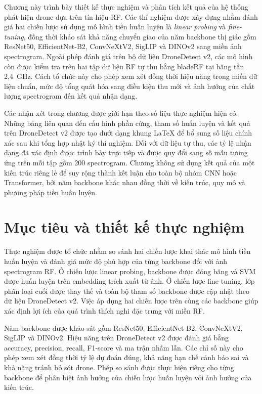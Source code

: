 \documentclass[../DoAn.tex]{subfiles}
\begin{document}
\label{chap:danh_gia_thuc_nghiem}

Chương này trình bày thiết kế thực nghiệm và phân tích kết quả của hệ thống phát hiện drone dựa trên tín hiệu RF. Các thí nghiệm được xây dựng nhằm đánh giá hai chiến lược sử dụng mô hình tiền huấn luyện là \textit{linear probing} và \textit{fine-tuning}, đồng thời khảo sát khả năng chuyển giao của năm backbone thị giác gồm ResNet50, EfficientNet-B2, ConvNeXtV2, SigLIP và DINOv2 sang miền ảnh spectrogram. Ngoài phép đánh giá trên bộ dữ liệu DroneDetect v2, các mô hình còn được kiểm tra trên hai tập dữ liệu RF tự thu bằng bladeRF tại băng tần 2,4~GHz. Cách tổ chức này cho phép xem xét đồng thời hiệu năng trong miền dữ liệu chuẩn, mức độ tổng quát hóa sang điều kiện thu mới và ảnh hưởng của chất lượng spectrogram đến kết quả nhận dạng.

Các nhận xét trong chương được giới hạn theo số liệu thực nghiệm hiện có. Những bảng liên quan đến cấu hình phần cứng, tham số huấn luyện và kết quả trên DroneDetect v2 được tạo dưới dạng khung LaTeX để bổ sung số liệu chính xác sau khi tổng hợp nhật ký thí nghiệm. Đối với dữ liệu tự thu, các tỷ lệ nhận dạng đã xác định được trình bày trực tiếp và được quy đổi sang số mẫu tương ứng trên mỗi tập gồm 200 spectrogram. Chương không sử dụng kết quả của một kiến trúc riêng lẻ để suy rộng thành kết luận cho toàn bộ nhóm CNN hoặc Transformer, bởi năm backbone khác nhau đồng thời về kiến trúc, quy mô và phương pháp tiền huấn luyện.

\section{Mục tiêu và thiết kế thực nghiệm}

Thực nghiệm được tổ chức nhằm so sánh hai chiến lược khai thác mô hình tiền huấn luyện và đánh giá mức độ phù hợp của từng backbone đối với ảnh spectrogram RF. Ở chiến lược linear probing, backbone được đóng băng và SVM được huấn luyện trên embedding trích xuất từ ảnh. Ở chiến lược fine-tuning, lớp phân loại cuối được thay thế và toàn bộ tham số backbone được cập nhật theo dữ liệu DroneDetect v2. Việc áp dụng hai chiến lược trên cùng các backbone giúp xác định lợi ích của quá trình thích nghi đặc trưng với miền RF.

Năm backbone được khảo sát gồm ResNet50, EfficientNet-B2, ConvNeXtV2, SigLIP và DINOv2. Hiệu năng trên DroneDetect v2 được đánh giá bằng accuracy, precision, recall, F1-score và ma trận nhầm lẫn. Các chỉ số này cho phép xem xét đồng thời tỷ lệ dự đoán đúng, khả năng hạn chế cảnh báo sai và khả năng tránh bỏ sót drone. Phép so sánh được thực hiện riêng cho từng backbone để phân biệt ảnh hưởng của chiến lược huấn luyện với ảnh hưởng của kiến trúc.
\end{document}
